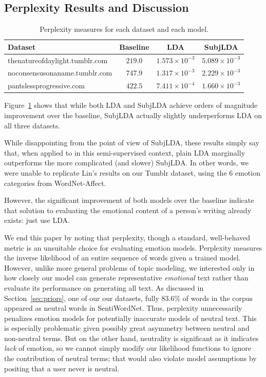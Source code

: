 \documentclass{article}
\begin{document}
\subsection{Perplexity Results and Discussion}
\begin{table}
\centering
\begin{tabular}{l c c c}
\bf Dataset & \bf Baseline & \bf LDA & \bf SubjLDA \\
\hline
thenatureofdaylight.tumblr.com & $219.0$ & $1.573 \times 10^{-3}$ & $5.089 \times 10^{-3}$ \\
noconsensusonaname.tumblr.com  & $747.9$ & $1.317 \times 10^{-3}$ & $2.229 \times 10^{-3}$ \\
pantslessprogressive.com       & $422.5$ & $7.411 \times 10^{-4}$ & $1.660 \times 10^{-3}$ \\
\end{tabular}
\caption{Perplexity measures for each dataset and each model.\label{tab:perp}}
\end{table}
Figure~\ref{tab:perp} shows that while both LDA and SubjLDA achieve
orders of magnitude improvement over the baseline, SubjLDA actually
slightly underperforms LDA on all three datasets.

While disappointing from the point of view of SubjLDA, these results
simply say that, when applied to in this semi-supervised context,
plain LDA marginally outperforms the more complicated (and slower)
SubjLDA. In other words, we were unable to replicate Lin's results
on our Tumblr dataset, using the 6 emotion categories from
WordNet-Affect.

However, the significant improvement of both models over the baseline
indicate that solution to evaluating the emotional content of
a person's writing already exists: just use LDA.

We end this paper by noting that perplexity, though a standard,
well-behaved metric is an unsuitable choice for evaluating emotion
models. Perplexity measures the inverse likelihood of an entire
sequence of words given a trained model. However, unlike more general
problems of topic modeling, we interested only in how closely our
model can generate representative \emph{emotional} text rather than
evaluate its performance on generating all text.  As discussed in
Section~\ref{sec:priors}, one of our our datasets, fully 83.6\% of
words in the corpus appeared as neutral words in SentiWordNet.
Thus, perplexity unnecessarily penalizes emotion models for
potentially inaccurate models of neutral text. This is especially
problematic given possibly great asymmetry between neutral and
non-neutral terms. But on the other hand, neutrality is significant
as it indicates \emph{lack} of emotion, so we cannot simply modify
our likelihood functions to ignore the contribution of neutral terms;
that would also violate model assumptions by positing that a user
never is neutral.
\end{document}
